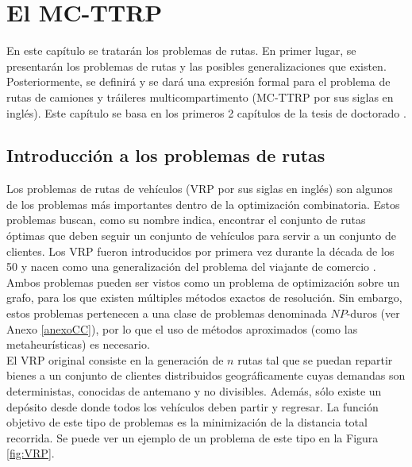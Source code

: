 \chapter{El MC-TTRP}\label{chapter:2}
En este capítulo se tratarán los problemas de rutas. En primer lugar, se presentarán los problemas de rutas y las posibles generalizaciones que existen. Posteriormente, se definirá y se dará una expresión formal para el problema de rutas de camiones y tráileres multicompartimento (MC-TTRP por sus siglas en inglés). Este capítulo se basa en los primeros 2 capítulos de la tesis de doctorado \cite{laura-mcttrp}.
\section{Introducción a los problemas de rutas}
Los problemas de rutas de vehículos (VRP por sus siglas en inglés) son algunos de los problemas más importantes dentro de la optimización combinatoria. Estos problemas buscan, como su nombre indica, encontrar el conjunto de rutas óptimas que deben seguir un conjunto de vehículos para servir a un conjunto de clientes. Los VRP fueron introducidos por primera vez durante la década de los 50 \cite{vrp-og} y nacen como una generalización del problema del viajante de comercio \cite{tsp-dantzig}. Ambos problemas pueden ser vistos como un problema de optimización sobre un grafo, para los que existen múltiples métodos exactos de resolución. Sin embargo, estos problemas pertenecen a una clase de problemas denominada $NP$-duros (ver Anexo \ref{anexoCC}), por lo que el uso de métodos aproximados (como las metaheurísticas) es necesario.\\

El VRP original consiste en la generación de $n$ rutas tal que se puedan repartir bienes a un conjunto de clientes distribuidos geográficamente cuyas demandas son deterministas, conocidas de antemano y no divisibles. Además, sólo existe un depósito desde donde todos los vehículos deben partir y regresar. La función objetivo de este tipo de problemas es la minimización de la distancia total recorrida. Se puede ver un ejemplo de un problema de este tipo en la Figura \ref{fig:VRP}.\\

